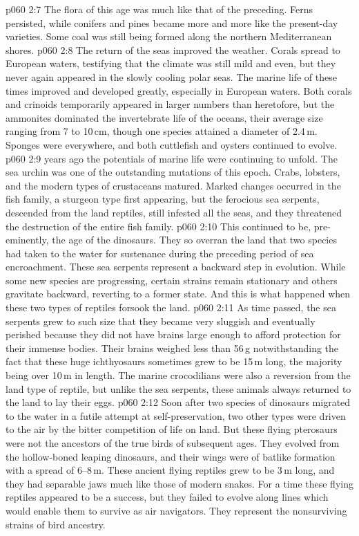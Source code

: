 \vs p060 2:7 The flora of this age was much like that of the preceding. Ferns persisted, while conifers and pines became more and more like the present\hyp{}day varieties. Some coal was still being formed along the northern Mediterranean shores.
\vs p060 2:8 The return of the seas improved the weather. Corals spread to European waters, testifying that the climate was still mild and even, but they never again appeared in the slowly cooling polar seas. The marine life of these times improved and developed greatly, especially in European waters. Both corals and crinoids temporarily appeared in larger numbers than heretofore, but the ammonites dominated the invertebrate life of the oceans, their average size ranging from 7 to 10\,cm, though one species attained a diameter of 2.4\,m. Sponges were everywhere, and both cuttlefish and oysters continued to evolve.
\vs p060 2:9 \pc {} years ago the potentials of marine life were continuing to unfold. The sea urchin was one of the outstanding mutations of this epoch. Crabs, lobsters, and the modern types of crustaceans matured. Marked changes occurred in the fish family, a sturgeon type first appearing, but the ferocious sea serpents, descended from the land reptiles, still infested all the seas, and they threatened the destruction of the entire fish family.
\vs p060 2:10 This continued to be, pre\hyp{}eminently, the age of the dinosaurs. They so overran the land that two species had taken to the water for sustenance during the preceding period of sea encroachment. These sea serpents represent a backward step in evolution. While some new species are progressing, certain strains remain stationary and others gravitate backward, reverting to a former state. And this is what happened when these two types of reptiles forsook the land.
\vs p060 2:11 As time passed, the sea serpents grew to such size that they became very sluggish and eventually perished because they did not have brains large enough to afford protection for their immense bodies. Their brains weighed less than 56\,g notwithstanding the fact that these huge ichthyosaurs sometimes grew to be 15\,m long, the majority being over 10\,m in length. The marine crocodilians were also a reversion from the land type of reptile, but unlike the sea serpents, these animals always returned to the land to lay their eggs.
\vs p060 2:12 Soon after two species of dinosaurs migrated to the water in a futile attempt at self\hyp{}preservation, two other types were driven to the air by the bitter competition of life on land. But these flying pterosaurs were not the ancestors of the true birds of subsequent ages. They evolved from the hollow\hyp{}boned leaping dinosaurs, and their wings were of batlike formation with a spread of 6--8\,m. These ancient flying reptiles grew to be 3\,m long, and they had separable jaws much like those of modern snakes. For a time these flying reptiles appeared to be a success, but they failed to evolve along lines which would enable them to survive as air navigators. They represent the nonsurviving strains of bird ancestry.

